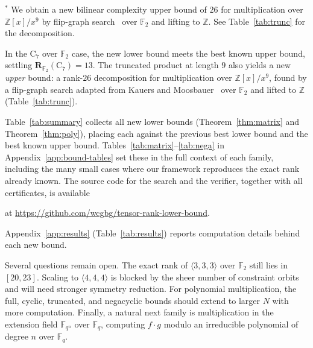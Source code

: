 \documentclass[11pt]{article}
\theoremstyle{definition}
\newcommand{\F}{\mathbb{F}}
\newcommand{\Rk}[2]{\mathbf{R}_{#1}(#2)}
\newcommand{\Cyct}[1]{\mathrm{C}_{#1}}
\newcommand{\mmt}[3]{\langle #1,#2,#3\rangle}
\newif\ifanon
\begin{document}
\begin{table}[!ht]
  \smallskip
  {\footnotesize\raggedright
    $^\ast$ We obtain a new bilinear complexity upper bound of $26$ for multiplication over $\mathbb{Z}[x]/x^9$ by flip-graph search~\cite{kauers2023flip} over $\F_2$ and lifting to $\mathbb{Z}$. See Table~\ref{tab:trunc} for the decomposition.
  \par}
  \caption{The 21 new lower bounds (3 matrix, 18 polynomial) proved in this paper.}
  \label{tab:summary}
\end{table}

In the $\Cyct{7}$ over $\F_2$ case, the new lower bound meets the best known
upper bound, settling $\Rk{\F_2}{\Cyct{7}}=13$. The truncated product at length $9$
also yields a new \emph{upper} bound: a rank-$26$ decomposition for multiplication
over $\mathbb{Z}[x]/x^9$, found by a flip-graph search adapted from Kauers and Moosbauer~\cite{kauers2023flip} over
$\F_2$ and lifted to $\mathbb{Z}$ (Table~\ref{tab:trunc}).

Table~\ref{tab:summary} collects all new lower bounds (Theorem~\ref{thm:matrix} and
Theorem~\ref{thm:poly}), placing each against the previous best lower bound and the
best known upper bound. Tables~\ref{tab:matrix}--\ref{tab:nega} in
Appendix~\ref{app:bound-tables} set these in the full context of each family,
including the many small cases where our framework reproduces the exact rank already
known.
The source code for the search and the verifier, together with all certificates, is
available
\ifanon
in an anonymized archive for double-blind
review.\footnote{\url{https://zenodo.org/records/22036500?preview=1&token=eyJhbGciOiJIUzUxMiJ9.eyJpZCI6ImVlMDgyZjYyLTI3NGEtNGEzMi1hNzQzLWIzZjZjMGQzZWQzMCIsImRhdGEiOnt9LCJyYW5kb20iOiJmOWMxZWE5NTNmZTc3MTkxZjRjMWY5Y2RiNTA2ZTgzOSJ9.aFASM6aDU5gb-fyM6NYG64M_AcEQ6FOjk5cDxJ48WiOuqFPFFM9Vh5MLslo1cQxYo43tmIjOtDtQhFnnGokWOg}}
\footnote{The matrix-multiplication lower bound search code was written by the author, while
Claude Code was used to adapt it to the polynomial-multiplication families.}
\else
at \url{https://github.com/wcgbg/tensor-rank-lower-bound}.
\fi
Appendix~\ref{app:results} (Table~\ref{tab:results}) reports computation details behind each new bound.

Several questions remain open. The exact rank of $\mmt{3}{3}{3}$ over $\F_2$ still
lies in $[20,23]$. Scaling to $\mmt{4}{4}{4}$ is blocked by the sheer number of
constraint orbits and will need stronger symmetry reduction. For polynomial
multiplication, the full, cyclic, truncated, and negacyclic bounds should extend to
larger $N$ with more computation. Finally, a natural next family is multiplication in
the extension field $\F_{q^n}$ over $\F_q$, computing $f\cdot g$ modulo an
irreducible polynomial of degree $n$ over $\F_q$.
\end{document}
